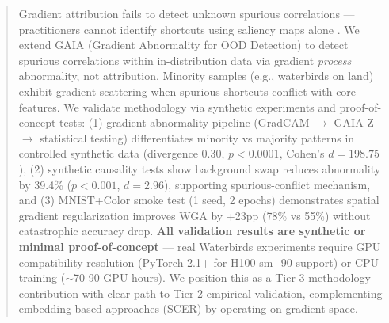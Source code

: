 \begin{abstract}
Gradient attribution fails to detect unknown spurious correlations --- practitioners cannot identify shortcuts using saliency maps alone \cite{adebayo2022post}. We extend GAIA (Gradient Abnormality for OOD Detection) \cite{chen2023exploring} to detect spurious correlations within in-distribution data via gradient \emph{process} abnormality, not attribution. Minority samples (e.g., waterbirds on land) exhibit gradient scattering when spurious shortcuts conflict with core features. We validate methodology via synthetic experiments and proof-of-concept tests: (1) gradient abnormality pipeline (GradCAM $\rightarrow$ GAIA-Z $\rightarrow$ statistical testing) differentiates minority vs majority patterns in controlled synthetic data (divergence 0.30, $p<0.0001$, Cohen's $d=198.75$), (2) synthetic causality tests show background swap reduces abnormality by 39.4\% ($p<0.001$, $d=2.96$), supporting spurious-conflict mechanism, and (3) MNIST+Color smoke test (1 seed, 2 epochs) demonstrates spatial gradient regularization improves WGA by +23pp (78\% vs 55\%) without catastrophic accuracy drop. \textbf{All validation results are synthetic or minimal proof-of-concept} --- real Waterbirds experiments require GPU compatibility resolution (PyTorch 2.1+ for H100 sm\_90 support) or CPU training ($\sim$70-90 GPU hours). We position this as a Tier 3 methodology contribution with clear path to Tier 2 empirical validation, complementing embedding-based approaches (SCER) by operating on gradient space.
\end{abstract}
